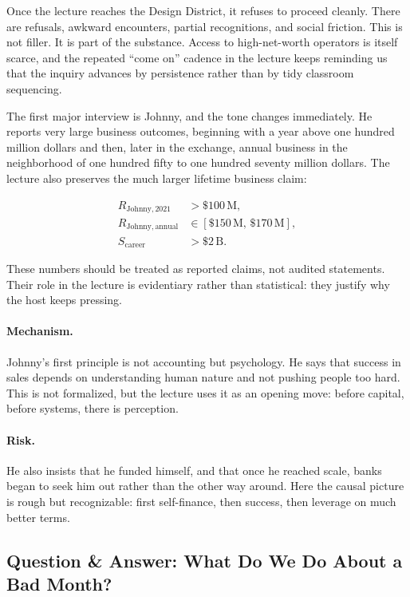 Once the lecture reaches the Design District, it refuses to proceed cleanly. There are refusals, awkward encounters, partial recognitions, and social friction. This is not filler. It is part of the substance. Access to high-net-worth operators is itself scarce, and the repeated ``come on'' cadence in the lecture keeps reminding us that the inquiry advances by persistence rather than by tidy classroom sequencing.

The first major interview is Johnny, and the tone changes immediately. He reports very large business outcomes, beginning with a year above one hundred million dollars and then, later in the exchange, annual business in the neighborhood of one hundred fifty to one hundred seventy million dollars. The lecture also preserves the much larger lifetime business claim:

\begin{align}
R_{\mathrm{Johnny},2021} &> \$100\,\mathrm{M},\\
R_{\mathrm{Johnny,annual}} &\in [\$150\,\mathrm{M},\,\$170\,\mathrm{M}],\\
S_{\mathrm{career}} &> \$2\,\mathrm{B}.
\end{align}

These numbers should be treated as reported claims, not audited statements. Their role in the lecture is evidentiary rather than statistical: they justify why the host keeps pressing.

\paragraph{Mechanism.} Johnny's first principle is not accounting but psychology. He says that success in sales depends on understanding human nature and not pushing people too hard. This is not formalized, but the lecture uses it as an opening move: before capital, before systems, there is perception.

\paragraph{Risk.} He also insists that he funded himself, and that once he reached scale, banks began to seek him out rather than the other way around. Here the causal picture is rough but recognizable: first self-finance, then success, then leverage on much better terms.

\subsection{Question \& Answer: What Do We Do About a Bad Month?}

